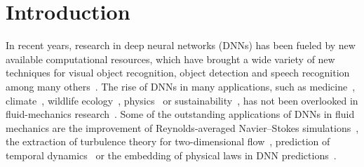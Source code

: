 %
%
%
%





%




\section{Introduction}

In recent years, research in deep neural networks (DNNs) has been fueled by new available computational resources, which have brought a wide variety of new techniques for visual object recognition, object detection and speech recognition among many others~\citep{lecun2015deep}.
The rise of DNNs in many applications, such as medicine~\citep{zeleznik2021deep,de2018clinically}, climate~\citep{waldmann2019mapping}, wildlife ecology~\citep{norouzzadeh2018automatically}, physics~\citep{udrescu2020ai,kwon2020magnetic} or sustainability~\citep{vinuesa2020role}, has not been overlooked in fluid-mechanics research~\citep{kutz2017deep,brunton2020machine}.
Some of the outstanding applications of DNNs in fluid mechanics are the improvement of Reynolds-averaged Navier--Stokes simulations~\citep{ling2016reynolds}, the extraction of turbulence theory for two-dimensional flow~\citep{jimenez2018machine}, prediction of temporal dynamics~\citep{srinivasan2019predictions,eivazi2020recurrent} or the embedding of physical laws in DNN predictions~\citep{raissi2020hidden}.

